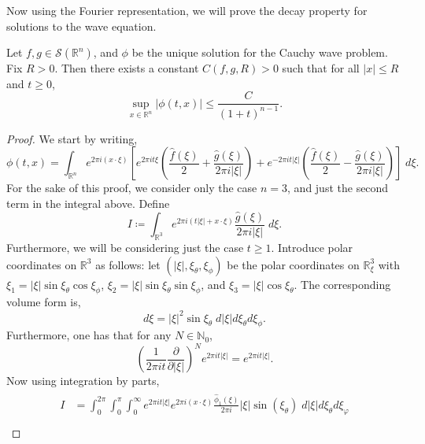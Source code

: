 \documentclass{article}
\numberwithin{equation}{section}
\begin{document}
	Now using the Fourier representation, we will prove the decay property for solutions to the wave equation. 
	
	\begin{prop}
		Let $f, g \in\mathcal{S}(\mathbb{R}^{n})$, and $\phi$ be the unique solution for the Cauchy wave problem. Fix $R > 0$. Then there exists a constant $C(f, g, R) > 0$ such that for all $|x|\leq R$ and $t \geq 0$, 
		\begin{equation}
			\sup_{x \in \mathbb{R}^{n}}|\phi(t,x)|\leq \frac{C}{(1 + t)^{n-1}}. 
		\end{equation}
	\end{prop}
	\begin{proof}
		We start by writing, 
		\begin{equation*}
			\phi(t, x) = \int_{\mathbb{R}^{n}}e^{2\pi i (x \cdot \xi)}\left[e^{2\pi i t \xi}\left(\frac{\hat{f}(\xi)}{2} + \frac{\hat{g}(\xi)}{2\pi i |\xi|}\right) + e^{-2\pi i t|\xi|}\left(\frac{\hat{f}(\xi)}{2} - \frac{\hat{g}(\xi)}{2\pi i |\xi|}\right)\right]\;d\xi. 
		\end{equation*}
		For the sake of this proof, we consider only the case $n = 3$, and just the second term in the integral above. Define 
		\begin{equation*}
			I \coloneqq \int_{\mathbb{R}^{3}}e^{2\pi i (t|\xi| + x \cdot \xi)}\frac{\hat{g}(\xi)}{2\pi i |\xi|}\;d\xi. 
		\end{equation*}
		Furthermore, we will be considering just the case $t \geq 1$. Introduce polar coordinates on $\mathbb{R}^{3}$ as follows: let $(|\xi|, \xi_{\theta}, \xi_{\phi})$ be the polar coordinates on $\mathbb{R}^{3}_{\xi}$ with $\xi_{1} = |\xi|\sin{\xi_{\theta}}\cos{\xi_{\phi}}$, $\xi_{2} = |\xi|\sin{\xi_{\theta}}\sin{\xi_{\phi}}$, and $\xi_{3} = |\xi|\cos{\xi_{\theta}}$. The corresponding volume form is, 
		\begin{equation*}
			d\xi = |\xi|^{2}\sin{\xi_{\theta}}\;d|\xi|d\xi_{\theta}d\xi_{\phi}. 
		\end{equation*} 
		Furthermore, one has that for any $N \in \mathbb{N}_{0}$, 
		\begin{equation*}
			\left(\frac{1}{2\pi i t}\frac{\partial}{\partial |\xi|}\right)^{N}e^{2\pi i t|\xi|} = e^{2\pi i t|\xi|}. 
		\end{equation*}
		Now using integration by parts, 
		\begin{align*}
			\begin{split}
				I &= \int_0^{2\pi}\int_0^\pi\int_0^\infty e^{2\pi i t|\xi|} e^{2\pi i (x \cdot \xi)} \frac{\hat{\phi}_1(\xi)}{2\pi i}|\xi|\sin(\xi_\theta)\;d|\xi|d\xi_\theta d\xi_\varphi \\

\end{split}
\end{align*}
\end{proof}
\end{document}
